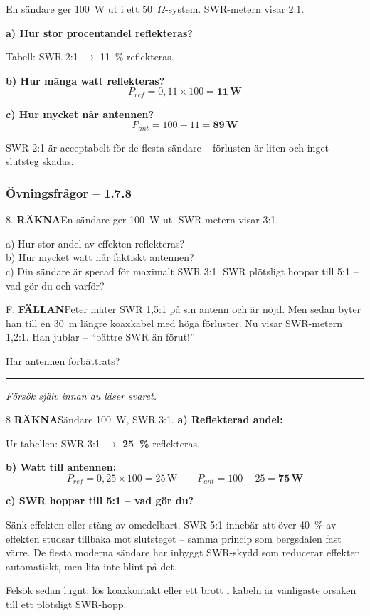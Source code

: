 \documentclass[a4paper,11pt,twoside]{book}
\newcommand{\qrakna}{\colorbox{bluepale}{\textcolor{bluedark}{\headingfont\bfseries\tiny RÄKNA}}}
\newcommand{\qfallan}{\colorbox{ljusbrun}{\textcolor{kakao}{\headingfont\bfseries\tiny FÄLLAN}}}
\begin{document}
\begin{worked}[title={Räkneexempel 1.7.8 -- Reflekterad effekt}]
En sändare ger 100~W ut i ett 50~$\Omega$-system. 
SWR-metern visar 2:1.

\textbf{a) Hur stor procentandel reflekteras?}

Tabell: SWR 2:1 $\rightarrow$ 11~\% reflekteras.

\textbf{b) Hur många watt reflekteras?}
\[ P_{ref} = 0{,}11 \times 100 = \mathbf{11\,\text{W}} \]

\textbf{c) Hur mycket når antennen?}
\[ P_{ant} = 100 - 11 = \mathbf{89\,\text{W}} \]

SWR 2:1 är acceptabelt för de flesta sändare -- 
förlusten är liten och inget slutsteg skadas.
\end{worked}

\subsubsection*{Övningsfrågor -- 1.7.8}

\begin{qblock}{8.}
\qrakna\quad En sändare ger 100~W ut. SWR-metern 
visar 3:1.

a) Hur stor andel av effekten reflekteras?\\
b) Hur mycket watt når faktiskt antennen?\\
c) Din sändare är specad för maximalt SWR 3:1. 
SWR plötsligt hoppar till 5:1 -- vad gör du 
och varför?
\end{qblock}

\begin{qblock}{F.}
\qfallan\quad Peter mäter SWR 1,5:1 på sin antenn 
och är nöjd. Men sedan byter han till en 30~m 
längre koaxkabel med höga förluster. Nu visar 
SWR-metern 1,2:1. Han jublar -- ``bättre SWR 
än förut!''

Har antennen förbättrats?
\end{qblock}

\medskip
\noindent\rule{\textwidth}{0.4pt}
{\small\itshape Försök själv innan du läser svaret.}
\medskip

\begin{facitblock}{8}
\qrakna\quad Sändare 100~W, SWR 3:1.
\tcblower
\textbf{a) Reflekterad andel:}

Ur tabellen: SWR 3:1 $\rightarrow$ \textbf{25~\%} reflekteras.

\textbf{b) Watt till antennen:}
\[ P_{ref} = 0{,}25 \times 100 = 25\,\text{W} \qquad
   P_{ant} = 100 - 25 = \mathbf{75\,\text{W}} \]

\textbf{c) SWR hoppar till 5:1 -- vad gör du?}

Sänk effekten eller stäng av omedelbart. SWR 5:1 innebär att över 
40~\% av effekten studsar tillbaka mot slutsteget -- samma princip 
som bergsdalen fast värre. De flesta moderna sändare har inbyggt 
SWR-skydd som reducerar effekten automatiskt, men lita inte blint 
på det.

Felsök sedan lugnt: lös koaxkontakt eller ett brott i kabeln är 
vanligaste orsaken till ett plötsligt SWR-hopp.
\end{facitblock}
\end{document}
